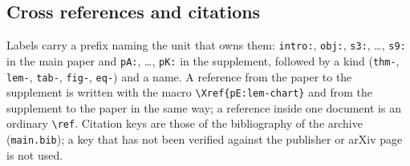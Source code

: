 \endgroup

\subsection{Cross references and citations}\label{pA:sec-xref}
Labels carry a prefix naming the unit that owns them: \texttt{intro:}, \texttt{obj:}, \texttt{s3:}, \dots, \texttt{s9:} in the main paper and \texttt{pA:}, \dots, \texttt{pK:} in the supplement, followed by a kind (\texttt{thm-}, \texttt{lem-}, \texttt{tab-}, \texttt{fig-}, \texttt{eq-}) and a name. A reference from the paper to the supplement is written with the macro \verb|\Xref{pE:lem-chart}| and from the supplement to the paper in the same way; a reference inside one document is an ordinary \verb|\ref|. Citation keys are those of the bibliography of the archive (\texttt{main.bib}); a key that has not been verified against the publisher or arXiv page is not used.
